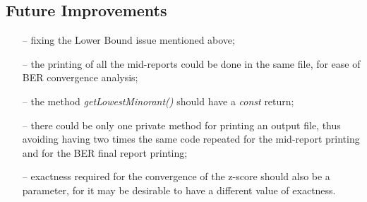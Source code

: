 \begin{refsection}
\subsection*{Future Improvements}
\begin{itemize}
    \item[--] fixing the Lower Bound issue mentioned above;
    \item[--] the printing of all the mid-reports could be done in the same file, for ease of BER convergence analysis;
    \item[--] the method \textit{getLowestMinorant()} should have a \textit{const} return;
    \item[--] there could be only one private method for printing an output file, thus avoiding having two times the same code repeated for the mid-report printing and for the BER final report printing;
    \item[--] exactness required for the convergence of the z-score should also be a parameter, for it may be desirable to have a different value of exactness.
\end{itemize}

\printbibliography[heading=subbibliography]
\end{refsection}
\cleardoublepage
